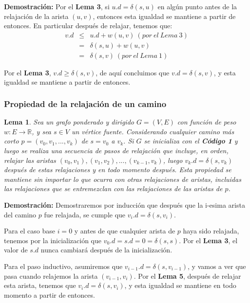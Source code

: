 \documentclass[12pt]{article}
\newcommand{\proof}{\textbf{Demostración:} }
\newcommand{\nl}{\vspace{0.3cm}}
\newtheorem{lemma}{Lema}
\begin{document}
\proof Por el \textbf{Lema 3}, si $u.d = \delta(s, u)$ en algún punto antes de la relajación de la arista $(u, v)$, entonces esta igualdad se mantiene a partir de entonces. En particular después de relajar, tenemos que:
\begin{eqnarray*}
	v.d	& \leqslant	& u.d + w(u, v) \ (por\ el\ Lema\ 3) \\
	& =			& \delta(s, u) + w(u, v) \\
	& =			& \delta(s, v) \ (por\ el\ Lema\ 1)
\end{eqnarray*}

Por el \textbf{Lema 3}, $v.d \geqslant \delta(s, v)$, de aquí concluimos que $v.d = \delta(s, v)$, y esta igualdad se mantiene a partir de entonces.

\subsubsection{Propiedad de la relajación de un camino}

\nl

\begin{lemma}
	Sea un grafo ponderado y dirigido $G = (V, E)$ con función de peso $w: E \rightarrow \mathbb{R}$, y sea $s \in V$ un vértice fuente. Considerando cualquier camino más corto $p = (v_0, v_1, ..., v_k)$ de $s = v_0$ a $v_k$. Si $G$ se inicializa con el \textbf{Código 1} y luego se realiza una secuencia de pasos de relajación que incluye, en orden, relajar las aristas $(v_0, v_1), (v_1, v_2), ..., (v_{k-1}, v_k)$, luego $v_{k}.d = \delta(s, v_k)$ después de estas relajaciones y en todo momento después. Esta propiedad se mantiene sin importar lo que ocurra con otras relajaciones de aristas, incluidas las relajaciones que se entremezclan con las relajaciones de las aristas de $p$.
\end{lemma}

\proof Demostraremos por inducción que después que la i-esima arista del camino $p$ fue relajada, se cumple que $v_{i}.d = \delta(s, v_i)$.

\nl

Para el caso base $i = 0$ y antes de que cualquier arista de $p$ haya sido relajada, tenemos por la inicialización que $v_{0}.d = s.d = 0 = \delta(s, s)$. Por el \textbf{Lema 3}, el valor de $s.d$ nunca cambiará después de la inicialización.

\nl

Para el paso inductivo, asumiremos que $v_{i-1}.d = \delta(s, v_{i-1})$, y vamos a ver que pasa cuando relajemos la arista $(v_{i-1}, v_i)$. Por el \textbf{Lema 5}, después de relajar esta arista, tenemos que $v_{i}.d = \delta(s, v_i)$, y esta igualdad se mantiene en todo momento a partir de entonces.
\end{document}
